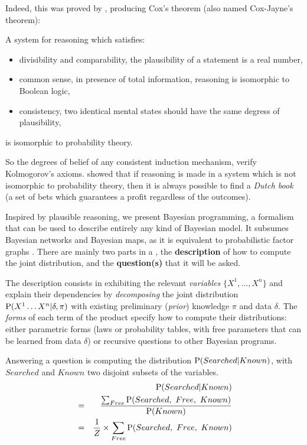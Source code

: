 Indeed, this was proved by \cite{Cox46}, producing Cox's theorem (also named Cox-Jayne's theorem):
\begin{mythm}
A system for reasoning which satisfies:
\begin{itemize}
    \item divisibility and comparability, the plausibility of a statement is a real number,
    \item common sense, in presence of total information, reasoning is isomorphic to Boolean logic,
    \item consistency, two identical mental states should have the same degress of plausibility,
\end{itemize}
is isomorphic to probability theory.
\end{mythm}
So the degrees of belief of any consistent induction mechanism, verify Kolmogorov's axioms. \cite{DeFinetti37} showed that if reasoning is made in a system which is not isomorphic to probability theory, then it is always possible to find a \textit{Dutch book} (a set of bets which guarantees a profit regardless of the outcomes). %


Inspired by plausible reasoning, we present Bayesian programming, a formalism that can be used to describe entirely any kind of Bayesian model. It subsumes Bayesian networks and Bayesian maps, as it is equivalent to probabilistic factor graphs \cite{Diard03}. There are mainly two parts in a , the \textbf{description} of how to compute the joint distribution, and the \textbf{question(s)} that it will be asked. 

The description consists in exhibiting the relevant \textit{variables} $\{X^1,\dots,X^n\}$ and explain their dependencies by \textit{decomposing} the joint distribution $\mathrm{P}(X^1\dots X^n | \delta, \pi)$ with existing preliminary (\textit{prior}) knowledge $\pi$ and data $\delta$. The \textit{forms} of each term of the product specify how to compute their distributions: either parametric forms (laws or probability tables, with free parameters that can be learned from data $\delta$) or recursive questions to other Bayesian programs.

Answering a question is computing the distribution $\mathrm{P}(Searched | Known)$, with $Searched$ and $Known$ two disjoint subsets of the variables. 
\begin{eqnarray}
& & \mathrm{P}(Searched | Known) \\
& = & \frac{\sum_{Free}\mathrm{P}(Searched,\ Free,\ Known)}{\mathrm{P}(Known)} \\
& = & \frac{1}{Z}\times \sum_{Free} \mathrm{P}(Searched,\ Free,\ Known)
\end{eqnarray}

